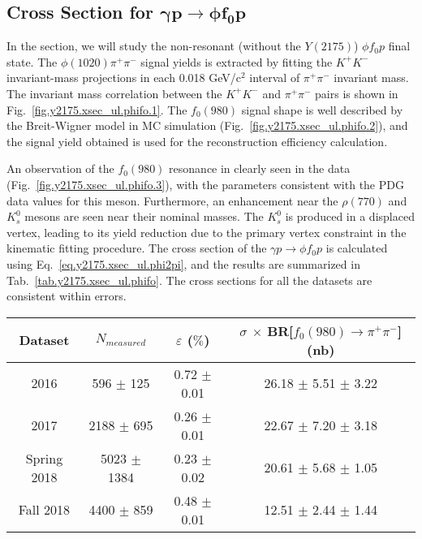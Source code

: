 \newpage
\subsection{Cross Section for \texorpdfstring{$\bm{\gamma p \rightarrow \phi f_0 p}$}{}}
\label{chap.y2175.xsec_ul.phifo}

In the section, we will study the non-resonant (without the $Y(2175)$) $\phi f_0 p$ final state. The $\phi(1020)\pi^{+}\pi^{-}$ signal yields is extracted by fitting the $K^{+}K^{-}$ invariant-mass projections in each 0.018 GeV/c$^{2}$ interval of $\pi^{+}\pi^{-}$ invariant mass. The invariant mass correlation between the $K^{+}K^{-}$ and $\pi^{+}\pi^{-}$ pairs is shown in Fig.~\ref{fig.y2175.xsec_ul.phifo.1}. The $f_{0}(980)$ signal shape is well described by the Breit-Wigner model in MC simulation (Fig.~\ref{fig.y2175.xsec_ul.phifo.2}), and the signal yield obtained is used for the reconstruction efficiency calculation.
~\par An observation of the $f_{0}(980)$ resonance in clearly seen in the data (Fig.~\ref{fig.y2175.xsec_ul.phifo.3}), with the parameters consistent with the PDG data values for this meson. Furthermore, an enhancement near the $\rho(770)$ and $K_{s}^{0}$ mesons are seen near their nominal masses. The $K_{s}^{0}$ is produced in a displaced vertex, leading to its yield reduction due to the primary vertex constraint in the kinematic fitting procedure. The cross section of the $\gamma p \rightarrow \phi f_0 p$ is calculated using Eq.~\ref{eq.y2175.xsec_ul.phi2pi}, and the results are summarized in Tab.~\ref{tab.y2175.xsec_ul.phifo}. The cross sections for all the datasets are consistent within errors.

\begin{table*}[!b]
    \centering
    \caption{A summary of the total cross section and efficiency for $\gamma p \rightarrow \phi f_0 p$. The statistical and systematics errors are displayed for the cross section. The systematic uncertainties will be discussed in Sec.~\ref{chap.y2175.syserr}}
    \label{tab.y2175.xsec_ul.phifo}
    \begin{tabular}{|c|c|c|c|}
        \hline
        Dataset & $N_{measured}$ & $\varepsilon$ ($\%$) & $\sigma$ $\times$ BR[$f_0(980) \rightarrow \pi^{+} \pi^{-}$] (nb) \\
        \hline
        2016 & 596 $\pm$ 125 & 0.72 $\pm$ 0.01 & 26.18 $\pm$ 5.51 $\pm$ 3.22 \\
        2017 & 2188 $\pm$ 695 & 0.26 $\pm$ 0.01 & 22.67 $\pm$ 7.20 $\pm$ 3.18 \\
        Spring 2018 & 5023 $\pm$ 1384 & 0.23 $\pm$ 0.02 & 20.61 $\pm$ 5.68 $\pm$ 1.05 \\
        Fall 2018 & 4400 $\pm$ 859 & 0.48 $\pm$ 0.01 & 12.51 $\pm$ 2.44 $\pm$ 1.44 \\
        \hline
    \end{tabular}
\end{table*}

